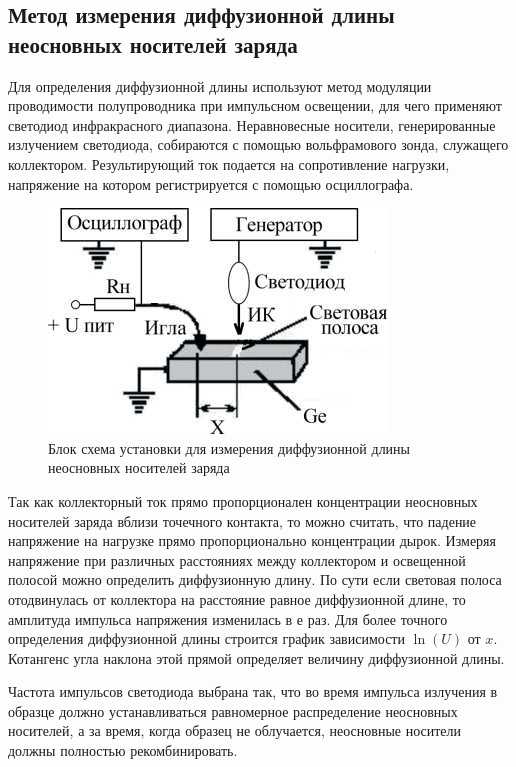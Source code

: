 \documentclass[a4paper,12pt]{article}
\begin{document}
\subsection{Метод измерения диффузионной длины неосновных носителей заряда}

Для определения диффузионной длины используют метод модуляции проводимости полупроводника при импульсном освещении, для чего применяют светодиод инфракрасного диапазона. Неравновесные носители, генерированные излучением светодиода, собираются с помощью вольфрамового зонда, служащего коллектором. Результирующий ток подается на сопротивление нагрузки, напряжение на котором регистрируется с помощью осциллографа.

\begin{figure}[H]
	\centering
	\includegraphics[]{13}
	\caption{Блок схема установки для измерения диффузионной длины неосновных носителей заряда}
	\label{fig:figure12}
\end{figure}


Так как коллекторный ток прямо пропорционален концентрации неосновных носителей заряда вблизи точечного контакта, то можно считать, что падение напряжение на нагрузке прямо пропорционально концентрации дырок. Измеряя напряжение при различных расстояниях между коллектором и освещенной полосой можно определить диффузионную длину. По сути если световая полоса отодвинулась от коллектора на расстояние равное диффузионной длине, то амплитуда импульса напряжения изменилась в $е$ раз. Для более точного определения диффузионной длины строится график зависимости $\ln(U)$ от $x$. Котангенс угла наклона этой прямой определяет величину диффузионной длины.

Частота импульсов светодиода выбрана так, что во время импульса излучения в образце должно устанавливаться равномерное распределение неосновных носителей, а за время, когда образец не облучается, неосновные носители должны полностью рекомбинировать.
\end{document}
